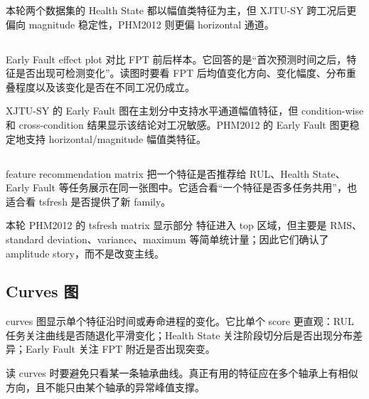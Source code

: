 本轮两个数据集的 Health State 都以幅值类特征为主，但 XJTU-SY 跨工况后更偏向 magnitude 稳定性，PHM2012 则更偏 horizontal 通道。

\subsection{}

Early Fault effect plot 对比 FPT 前后样本。它回答的是“首次预测时间之后，特征是否出现可检测变化”。读图时要看 FPT 后均值变化方向、变化幅度、分布重叠程度以及该变化是否在不同工况仍成立。

XJTU-SY 的 Early Fault 图在主划分中支持水平通道幅值特征，但 condition-wise 和 cross-condition 结果显示该结论对工况敏感。PHM2012 的 Early Fault 图更稳定地支持 horizontal/magnitude 幅值类特征。

\subsection{}

feature recommendation matrix 把一个特征是否推荐给 RUL、Health State、Early Fault 等任务展示在同一张图中。它适合看“一个特征是否多任务共用”，也适合看 tsfresh 是否提供了新 family。

本轮 PHM2012 的 tsfresh matrix 显示部分  特征进入 top 区域，但主要是 RMS、standard deviation、variance、maximum 等简单统计量；因此它们确认了 amplitude story，而不是改变主线。

\subsection{Curves 图}

curves 图显示单个特征沿时间或寿命进程的变化。它比单个 score 更直观：RUL 任务关注曲线是否随退化平滑变化；Health State 关注阶段切分后是否出现分布差异；Early Fault 关注 FPT 附近是否出现突变。

读 curves 时要避免只看某一条轴承曲线。真正有用的特征应在多个轴承上有相似方向，且不能只由某个轴承的异常峰值支撑。
